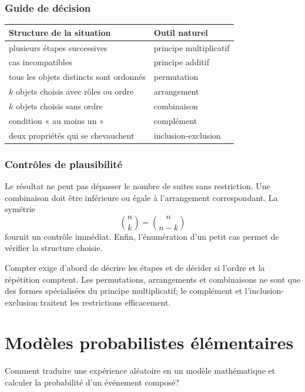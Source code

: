 \documentclass[12pt,a4paper,openany]{book}
\begin{document}
\subsection{Guide de décision}

\begin{center}
\begin{tabularx}{\textwidth}{@{}lY@{}}
\toprule
Structure de la situation & Outil naturel\\\midrule
plusieurs étapes successives & principe multiplicatif\\
cas incompatibles & principe additif\\
tous les objets distincts sont ordonnés & permutation\\
$k$ objets choisis avec rôles ou ordre & arrangement\\
$k$ objets choisis sans ordre & combinaison\\
condition « au moins un » & complément\\
deux propriétés qui se chevauchent & inclusion-exclusion\\
\bottomrule
\end{tabularx}
\end{center}

\subsection{Contrôles de plausibilité}

Le résultat ne peut pas dépasser le nombre de suites sans restriction. Une combinaison doit être inférieure ou égale à l'arrangement correspondant. La symétrie
\[
\binom nk=\binom n{n-k}
\]
fournit un contrôle immédiat. Enfin, l'énumération d'un petit cas permet de vérifier la structure choisie.

\begin{summarybox}
Compter exige d'abord de décrire les étapes et de décider si l'ordre et la répétition comptent. Les permutations, arrangements et combinaisons ne sont que des formes spécialisées du principe multiplicatif; le complément et l'inclusion-exclusion traitent les restrictions efficacement.
\end{summarybox}


\chapter{Modèles probabilistes élémentaires}

\begin{questionbox}
Comment traduire une expérience aléatoire en un modèle mathématique et calculer la probabilité d'un événement composé?
\end{questionbox}
\end{document}
